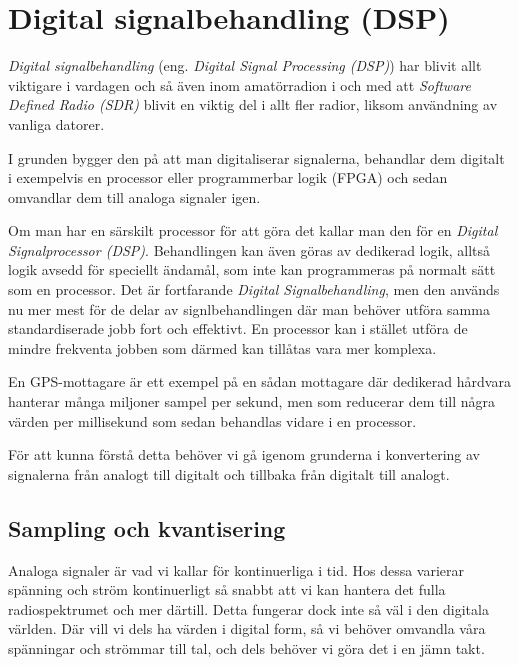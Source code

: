 \section{Digital signalbehandling (DSP)}
\label{DSP}

\emph{Digital signalbehandling} (eng. \emph{Digital Signal Processing (DSP)})
har blivit allt viktigare i vardagen och så även inom amatörradion i och med
att \emph{Software Defined Radio (SDR)} blivit en viktig del i allt fler
radior, liksom användning av vanliga datorer.

I grunden bygger den på att man digitaliserar signalerna, behandlar dem
digitalt i exempelvis en processor eller programmerbar logik (FPGA) och sedan
omvandlar dem till analoga signaler igen.

Om man har en särskilt processor för att göra det kallar man den för en
\emph{Digital Signalprocessor (DSP)}.
Behandlingen kan även göras av dedikerad logik, alltså logik avsedd för speciellt
ändamål, som inte kan programmeras på normalt sätt som en processor. Det är fortfarande
\emph{Digital Signalbehandling}, men den används nu mer mest för de delar av
signlbehandlingen där man behöver utföra samma standardiserade jobb fort och
effektivt.
En processor kan i stället utföra de mindre frekventa jobben som därmed kan
tillåtas vara mer komplexa.

En GPS-mottagare är ett exempel på en sådan mottagare där dedikerad hårdvara
hanterar många miljoner sampel per sekund, men som reducerar dem till några värden
per millisekund som sedan behandlas vidare i en processor.

För att kunna förstå detta behöver vi gå igenom grunderna i konvertering av
signalerna från analogt till digitalt och tillbaka från digitalt till analogt.

\subsection{Sampling och kvantisering}

Analoga signaler är vad vi kallar för kontinuerliga i tid. Hos dessa varierar spänning och
ström kontinuerligt så snabbt att vi kan hantera det fulla radiospektrumet och mer därtill.
Detta fungerar dock inte så väl i den digitala världen.
Där vill vi dels ha värden i digital form, så vi behöver omvandla våra spänningar
och strömmar till tal, och dels behöver vi göra det i en jämn takt.

